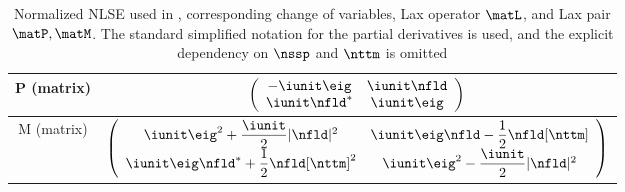 \begin{table*}[p]
\begin{tabu}{|c|c|}
        P (matrix) &
        $\left( \begin{array}{cc} -\iunit\eig &
          \iunit \nfld  \\
          \iunit\nfld^* &
          \iunit\eig \end{array}\right)$
        \\ \hline

        M (matrix) &
        $\left( \begin{array}{cc} \iunit\eig^2 + \dfrac{\iunit}{2}|\nfld|^2 &
          \iunit\eig\nfld - \dfrac{1}{2}\nfld[\nttm]  \\
          \iunit\eig\nfld^* + \dfrac{1}{2}\nfld[\nttm]^2 &
          \iunit \eig^2 - \dfrac{\iunit}{2}|\nfld|^2 \end{array}\right)$
        \\ \hline



        \end{tabu}
  \caption{Normalized \ac{NLSE} used in \cite{Agrawal12_NonlinearFOs_Book,hasegawa1995solitons,Hasegawa,
prilepsky2013nonlinear,desbruslais1996inverse}, corresponding change of variables, Lax operator $\matL$, and Lax pair $\matP, \matM$. The standard simplified notation for the partial derivatives is used, and the explicit dependency on $\nssp$ and $\nttm$ is omitted}
  \label{tab:normalizations_comparison_agrawal}
\end{table*}


